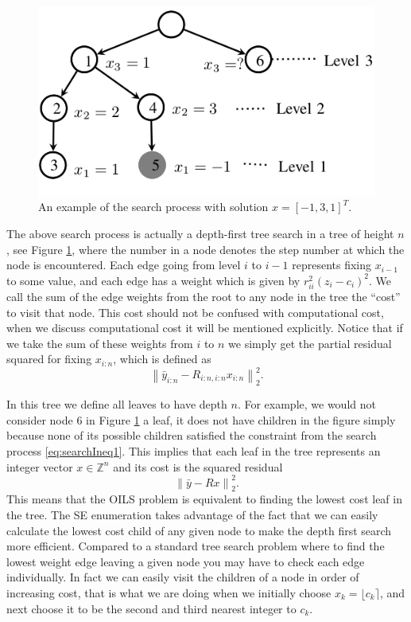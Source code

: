 \documentclass[12pt,Bold,letterpaper]{mcgilletdclass}
\begin{document}
\begin{figure}
\centering
\includegraphics[scale=0.5]{searchtree.png}
\caption{An example of the search process with solution $x = [-1,3,1]^T$.}
\label{fig:treeSearch}
\end{figure}

The above search process is actually a depth-first tree search in a tree of height $n$, see Figure \ref{fig:treeSearch},
where the number in a node  denotes the step number at which the node is encountered. Each edge going from level $i$ to $i-1$ represents fixing $x_{i-1}$ to some value, and each edge has a weight which is given by $r_{ii}^2(z_i -
c_i)^2$. We call the sum of the edge weights from the root to any node in the tree the ``cost'' to visit that node. This cost should not be confused with computational cost, when we discuss computational cost it will be mentioned explicitly. Notice that if we take the sum of these weights from $i$ to $n$ we simply get the partial
residual squared for fixing $x_{i:n}$, which is defined as $$\left \| \bar{y}_{i:n} - R_{i:n,i:n}x_{i:n} \right \|_2^2.$$ 

In this tree we define all leaves to have depth $n$. For example, we would not consider node $6$ in Figure \ref{fig:treeSearch} a leaf, it does not have children in the figure simply because none of its possible children satisfied the constraint from the search process \eqref{eq:searchIneq1}. This implies that each leaf in the tree
represents an integer vector $x \in \mathbb{Z}^n$ and its cost is the squared residual $$\left \|
 \bar{y} - Rx \right \|_2^2.$$ This means that the OILS problem is equivalent to
finding the lowest cost leaf in the tree. The SE enumeration takes advantage
of the fact that we can easily calculate the lowest cost child of any given
node to make the depth first search more efficient. Compared to a standard tree search problem where to find the lowest weight edge leaving a given node you may have to check each edge individually. In fact we can easily visit
the children of a node in order of increasing cost, that is what we are doing when we initially choose $x_k = \lfloor c_k \rceil$, and next choose it to be the second and third nearest integer to $c_k$.
\end{document}
